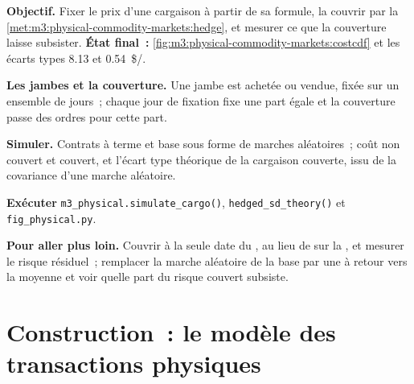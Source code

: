 \begin{tutorial}
\textbf{Objectif.} Fixer le prix d'une cargaison à partir de sa formule, la couvrir par
la \cref{met:m3:physical-commodity-markets:hedge}, et mesurer ce que la couverture laisse subsister.
\textbf{État final~:} \cref{fig:m3:physical-commodity-markets:costcdf} et les
écarts types \qty{8.13}{} et \qty{0.54}{\$/\barrel}.
\begin{tutsteps}
\item \textbf{Les jambes et la couverture.} Une jambe est achetée ou vendue, fixée sur un ensemble de
jours~; chaque jour de fixation fixe une part égale et la couverture passe des ordres pour cette part.
\label{lst:m3:physical-commodity-markets:legs}
\item \textbf{Simuler.} Contrats à terme et base sous forme de marches aléatoires~; coût non couvert et couvert,
et l'écart type théorique de la cargaison couverte, issu de la covariance d'une marche aléatoire.
\label{lst:m3:physical-commodity-markets:sim}
\item \textbf{Exécuter} \texttt{m3\_physical.simulate\_cargo()},
\texttt{hedged\_sd\_theory()} et \texttt{fig\_physical.py}.
\end{tutsteps}
\textbf{Pour aller plus loin.} Couvrir à la seule date du , au lieu de
sur la , et mesurer le risque résiduel~; remplacer la marche aléatoire de la base par une
à retour vers la moyenne et voir quelle part du risque couvert subsiste.
\end{tutorial}

\section{Construction~: le modèle des transactions physiques}\label{bld:m3:physical-commodity-markets:physdeal}

